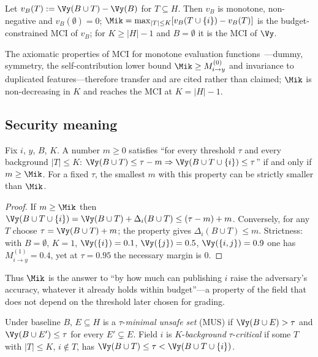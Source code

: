 \begin{proposition}\label{prop:mci}
Let $v_B(T) := \Vy(B \cup T) - \Vy(B)$ for $T \subseteq H$. Then $v_B$ is monotone,
non-negative and $v_B(\emptyset)=0$; $\Mik = \max_{|T|\le K}[v_B(T\cup\{i\}) - v_B(T)]$ is the
budget-constrained MCI of $v_B$; for $K \ge |H|-1$ and $B=\emptyset$ it is the MCI of $\Vy$.
\end{proposition}
The axiomatic properties of MCI for monotone evaluation functions~\cite{catav2021mci}---dummy,
symmetry, the self-contribution lower bound $\Mik\ge M^{(0)}_{i\to y}$ and invariance to
duplicated features---therefore transfer and are cited rather than claimed; $\Mik$ is
non-decreasing in $K$ and reaches the MCI at $K=|H|-1$.

\subsection{Security meaning}
\begin{theorem}\label{thm:margin}
Fix $i$, $y$, $B$, $K$. A number $m\ge 0$ satisfies ``for every threshold $\tau$ and every
background $|T|\le K$: $\Vy(B\cup T)\le\tau-m \Rightarrow \Vy(B\cup T\cup\{i\})\le\tau$''
if and only if $m\ge\Mik$. For a fixed $\tau$, the smallest $m$ with this property can be
strictly smaller than $\Mik$.
\end{theorem}
\begin{proof}
If $m\ge\Mik$ then $\Vy(B\cup T\cup\{i\})=\Vy(B\cup T)+\Delta_i(B\cup T)\le(\tau-m)+m$.
Conversely, for any $T$ choose $\tau=\Vy(B\cup T)+m$; the property gives $\Delta_i(B\cup T)\le
m$. Strictness: with $B=\emptyset$, $K=1$, $\Vy(\{i\})=0.1$, $\Vy(\{j\})=0.5$,
$\Vy(\{i,j\})=0.9$ one has $M^{(1)}_{i\to y}=0.4$, yet at $\tau=0.95$ the necessary margin is $0$.
\end{proof}
Thus $\Mik$ is the answer to ``by how much can publishing $i$ raise the adversary's accuracy,
whatever it already holds within budget''---a property of the field that does not depend on
the threshold later chosen for grading.

\begin{definition}
Under baseline $B$, $E\subseteq H$ is a $\tau$-\emph{minimal unsafe set} (MUS) if
$\Vy(B\cup E)>\tau$ and $\Vy(B\cup E')\le\tau$ for every $E'\subsetneq E$. Field $i$ is
$K$-\emph{background} $\tau$-\emph{critical} if some $T$ with $|T|\le K$, $i\notin T$, has
$\Vy(B\cup T)\le\tau<\Vy(B\cup T\cup\{i\})$.
\end{definition}

